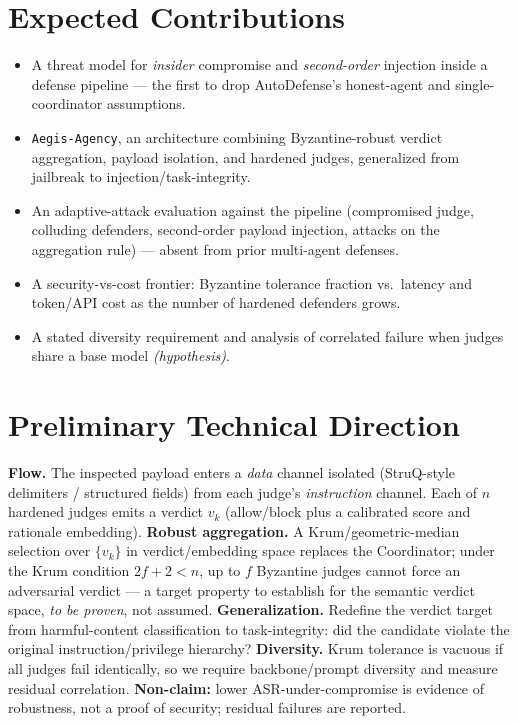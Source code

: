 \documentclass[11pt]{article}
\newcommand{\hyp}{\textit{(hypothesis)}\xspace}
\begin{document}
\section*{Expected Contributions}
\begin{itemize}
  \item A threat model for \emph{insider} compromise and \emph{second-order} injection inside a defense pipeline --- the first to drop AutoDefense's honest-agent and single-coordinator assumptions.
  \item \texttt{Aegis-Agency}, an architecture combining Byzantine-robust verdict aggregation, payload isolation, and hardened judges, generalized from jailbreak to injection/task-integrity.
  \item An adaptive-attack evaluation against the pipeline (compromised judge, colluding defenders, second-order payload injection, attacks on the aggregation rule) --- absent from prior multi-agent defenses.
  \item A security-vs-cost frontier: Byzantine tolerance fraction vs.\ latency and token/API cost as the number of hardened defenders grows.
  \item A stated diversity requirement and analysis of correlated failure when judges share a base model \hyp.
\end{itemize}

\section*{Preliminary Technical Direction}
\textbf{Flow.} The inspected payload enters a \emph{data} channel isolated (StruQ-style delimiters / structured fields) from each judge's \emph{instruction} channel. Each of $n$ hardened judges emits a verdict $v_k$ (allow/block plus a calibrated score and rationale embedding). \textbf{Robust aggregation.} A Krum/geometric-median selection over $\{v_k\}$ in verdict/embedding space replaces the Coordinator; under the Krum condition $2f+2<n$, up to $f$ Byzantine judges cannot force an adversarial verdict --- a target property to establish for the semantic verdict space, \emph{to be proven}, not assumed. \textbf{Generalization.} Redefine the verdict target from harmful-content classification to task-integrity: did the candidate violate the original instruction/privilege hierarchy? \textbf{Diversity.} Krum tolerance is vacuous if all judges fail identically, so we require backbone/prompt diversity and measure residual correlation. \textbf{Non-claim:} lower ASR-under-compromise is evidence of robustness, not a proof of security; residual failures are reported.
\end{document}
